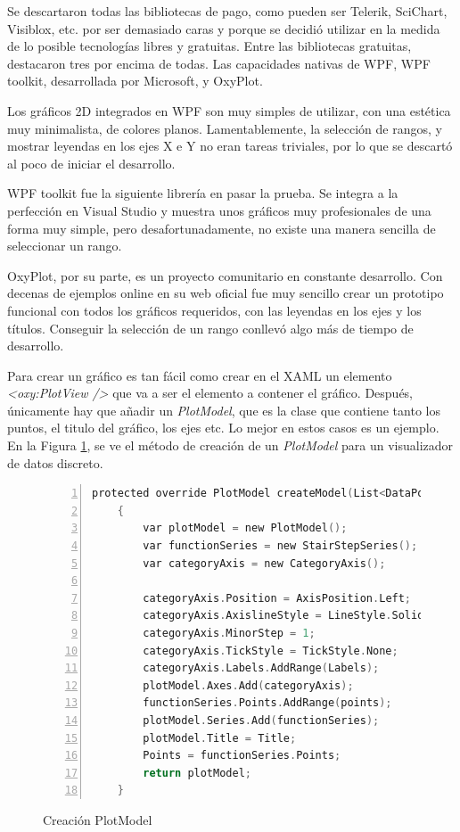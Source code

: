 Se descartaron todas las bibliotecas de pago, como pueden ser Telerik, SciChart, Visiblox, etc. por ser demasiado caras
y porque se decidi\'o utilizar en la medida de lo posible tecnolog\'ias libres y gratuitas. Entre las bibliotecas
gratuitas, destacaron tres por encima de todas. Las capacidades nativas de WPF,
WPF toolkit, desarrollada por Microsoft, y OxyPlot.

Los gr\'aficos 2D integrados en WPF son muy simples de utilizar, con una est\'etica muy minimalista, de colores planos.
Lamentablemente, la selecci\'on de rangos, y mostrar leyendas en los ejes X e Y no eran tareas triviales, por lo que
se descart\'o al poco de iniciar el desarrollo.

WPF toolkit fue la siguiente librer\'ia en pasar la prueba. Se integra a la perfecci\'on 
en Visual Studio y muestra unos gr\'aficos muy profesionales de una forma
muy simple, pero desafortunadamente, no existe una manera sencilla de seleccionar un rango.

OxyPlot, por su parte, es un proyecto comunitario en constante desarrollo. Con decenas de ejemplos online en su web
oficial fue muy sencillo crear un prototipo funcional con todos los gr\'aficos requeridos, con las leyendas en los ejes
y los t\'itulos. Conseguir la selecci\'on de un rango conllev\'o algo m\'as de tiempo de desarrollo.

Para crear un gr\'afico es tan f\'acil como crear en el XAML un elemento \emph{<oxy:PlotView />} que va a ser el 
elemento a contener el gr\'afico. Despu\'es, \'unicamente hay que a\~nadir un \emph{PlotModel}, que es la
clase que contiene tanto los puntos, el titulo del gr\'afico, los ejes etc. Lo mejor en estos casos es un ejemplo.
En la Figura \ref{CreacionPlotModel}, se ve el m\'etodo de creaci\'on de un \emph{PlotModel} para un visualizador de datos
discreto.

\begin{figure}[h]
    \begin{lstlisting}[tabsize=2, language=C, numbers=left, showspaces=false, breaklines=true]
    protected override PlotModel createModel(List<DataPoint> points)
    {
        var plotModel = new PlotModel();
        var functionSeries = new StairStepSeries();
        var categoryAxis = new CategoryAxis();
        
        categoryAxis.Position = AxisPosition.Left;
        categoryAxis.AxislineStyle = LineStyle.Solid;
        categoryAxis.MinorStep = 1;
        categoryAxis.TickStyle = TickStyle.None;
        categoryAxis.Labels.AddRange(Labels);
        plotModel.Axes.Add(categoryAxis);
        functionSeries.Points.AddRange(points);
        plotModel.Series.Add(functionSeries);
        plotModel.Title = Title;
        Points = functionSeries.Points;
        return plotModel;
    }
    \end{lstlisting}
    \caption[Creaci\'on PlotModel]{Creaci\'on PlotModel}
    \label{CreacionPlotModel}
\end{figure}

